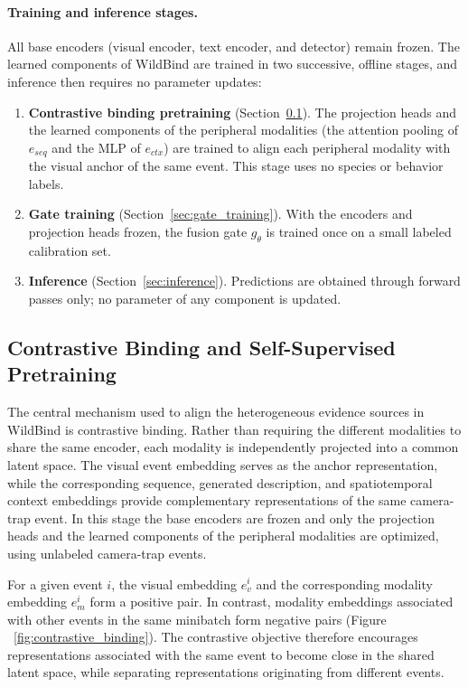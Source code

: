 \paragraph{Training and inference stages.} All base encoders (visual encoder, text encoder, and detector) remain frozen. The learned components of WildBind are trained in two successive, offline stages, and inference then requires no parameter updates:
\begin{enumerate}
\item \textbf{Contrastive binding pretraining} (Section~\ref{sec:contrastive_binding}). The projection heads and the learned components of the peripheral modalities (the attention pooling of $e_{seq}$ and the MLP of $e_{ctx}$) are trained to align each peripheral modality with the visual anchor of the same event. This stage uses no species or behavior labels.
\item \textbf{Gate training} (Section~\ref{sec:gate_training}). With the encoders and projection heads frozen, the fusion gate $g_\theta$ is trained once on a small labeled calibration set.
\item \textbf{Inference} (Section~\ref{sec:inference}). Predictions are obtained through forward passes only; no parameter of any component is updated.
\end{enumerate}

\subsection{Contrastive Binding and Self-Supervised Pretraining}
\label{sec:contrastive_binding}

The central mechanism used to align the heterogeneous evidence sources in WildBind is contrastive binding. Rather than requiring the different modalities to share the same encoder, each modality is independently projected into a common latent space. The visual event embedding serves as the anchor representation, while the corresponding sequence, generated description, and spatiotemporal context embeddings provide complementary representations of the same camera-trap event. In this stage the base encoders are frozen and only the projection heads and the learned components of the peripheral modalities are optimized, using unlabeled camera-trap events.

For a given event $i$, the visual embedding $e_v^i$ and the corresponding
modality embedding $e_m^i$ form a positive pair. In contrast, modality
embeddings associated with other events in the same minibatch form negative
pairs (Figure ~\ref{fig:contrastive_binding}). The contrastive objective therefore encourages representations
associated with the same event to become close in the shared latent space,
while separating representations originating from different events.

